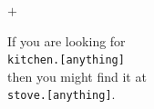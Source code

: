 \documentclass[aspectratio=169]{beamer}
\begin{document}
\begin{frame}[fragile]
\begin{center}
\begin{uncoverenv}
            \; $+$ \;
        \begin{minipage}[c][2cm][c]{0.46\textwidth}
            \begin{center}
            \smaller[1]
            If you are looking for \\
            \texttt{kitchen.[anything]} \\
            then you might find it at \\
            \texttt{stove.[anything]}. \\
            \end{center}
        \end{minipage}
        \end{uncoverenv}
    \end{center}
\end{frame}
\end{document}
